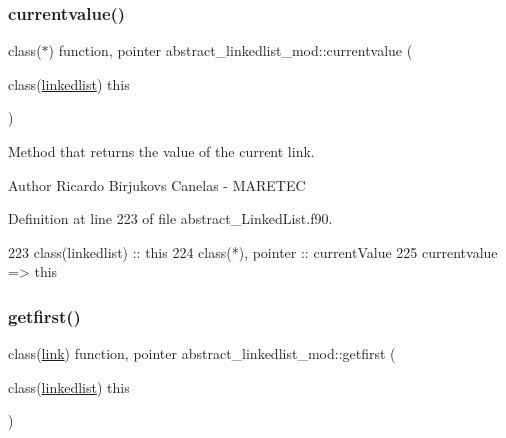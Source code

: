 \subsubsection{\texorpdfstring{currentvalue()}{currentvalue()}}
{\footnotesize\ttfamily class($\ast$) function, pointer abstract\+\_\+linkedlist\+\_\+mod\+::currentvalue (\begin{DoxyParamCaption}\item[{class(\mbox{\hyperlink{structabstract__linkedlist__mod_1_1linkedlist}{linkedlist}})}]{this }\end{DoxyParamCaption})\hspace{0.3cm}{\ttfamily [private]}}



Method that returns the value of the current link. 

\begin{DoxyAuthor}{Author}
Ricardo Birjukovs Canelas -\/ M\+A\+R\+E\+T\+EC 
\end{DoxyAuthor}


Definition at line 223 of file abstract\+\_\+\+Linked\+List.\+f90.


\begin{DoxyCode}
223     \textcolor{keywordtype}{class}(linkedlist) :: this
224     \textcolor{keywordtype}{class}(*), \textcolor{keywordtype}{pointer} :: currentValue
225     currentvalue => this%
\end{DoxyCode}
\mbox{\label{namespaceabstract__linkedlist__mod_ad7b7ffee891627ae2b0548001650f72b}} 
\subsubsection{\texorpdfstring{getfirst()}{getfirst()}}
{\footnotesize\ttfamily class(\mbox{\hyperlink{structlink__mod_1_1link}{link}}) function, pointer abstract\+\_\+linkedlist\+\_\+mod\+::getfirst (\begin{DoxyParamCaption}\item[{class(\mbox{\hyperlink{structabstract__linkedlist__mod_1_1linkedlist}{linkedlist}})}]{this }\end{DoxyParamCaption})\hspace{0.3cm}{\ttfamily [private]}}



